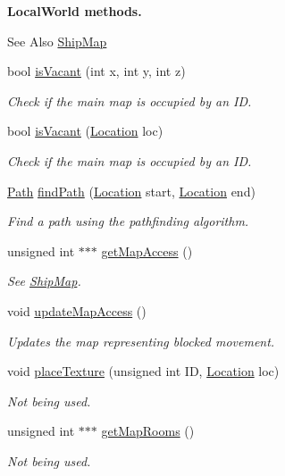 \begin{Indent}{\bf Local\-World methods.}\par
{\em \begin{DoxySeeAlso}{See Also}
\hyperlink{classShipMap}{Ship\-Map} 
\end{DoxySeeAlso}
}\begin{DoxyCompactItemize}
\item 
bool \hyperlink{classShipMaster_a2225b60d05aa9229f93856ad7b916b58}{is\-Vacant} (int x, int y, int z)
\begin{DoxyCompactList}\small\item\em Check if the main map is occupied by an I\-D. \end{DoxyCompactList}\item 
bool \hyperlink{classShipMaster_ae2f8c7068a577e8cddabc28583be8cf8}{is\-Vacant} (\hyperlink{structLocation}{Location} loc)
\begin{DoxyCompactList}\small\item\em Check if the main map is occupied by an I\-D. \end{DoxyCompactList}\item 
\hyperlink{classPath}{Path} \hyperlink{classShipMaster_aa5c31f505493362afdef36a00ba94956}{find\-Path} (\hyperlink{structLocation}{Location} start, \hyperlink{structLocation}{Location} end)
\begin{DoxyCompactList}\small\item\em Find a path using the pathfinding algorithm. \end{DoxyCompactList}\item 
unsigned int $\ast$$\ast$$\ast$ \hyperlink{classShipMaster_a334be261a5e3d9c50caa7506f0b2609c}{get\-Map\-Access} ()
\begin{DoxyCompactList}\small\item\em See \hyperlink{classShipMap}{Ship\-Map}. \end{DoxyCompactList}\item 
void \hyperlink{classShipMaster_a73b87519cbfc8289f9628695ebcc0cdb}{update\-Map\-Access} ()
\begin{DoxyCompactList}\small\item\em Updates the map representing blocked movement. \end{DoxyCompactList}\item 
void \hyperlink{classShipMaster_ae90bf5dd5fa1cbf24a4ddbd7b84e3446}{place\-Texture} (unsigned int I\-D, \hyperlink{structLocation}{Location} loc)
\begin{DoxyCompactList}\small\item\em Not being used. \end{DoxyCompactList}\item 
unsigned int $\ast$$\ast$$\ast$ \hyperlink{classShipMaster_a59892b34be3b803dc72ab332b783ad2c}{get\-Map\-Rooms} ()
\begin{DoxyCompactList}\small\item\em Not being used. \end{DoxyCompactList}\end{DoxyCompactItemize}
\end{Indent}

